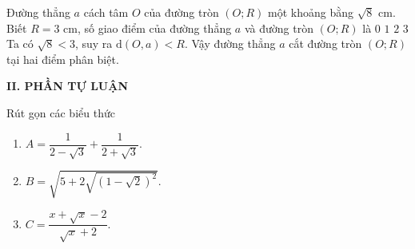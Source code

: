 \begin{ex}%
	 Đường thẳng $a$ cách tâm $O$ của đường tròn $(O;R)$ một khoảng bằng $\sqrt{8}$ cm. Biết $R=3$ cm, số giao điểm của đường thẳng $a$ và đường tròn $(O;R)$ là
	\choice
	{$0$}
	{$1$}
	{\True $2$}
	{$3$}
	\loigiai
	{ Ta có $\sqrt{8} < 3$, suy ra $\mathrm{d}(O,a)<R$. Vậy đường thẳng $a$ cắt đường tròn $(O;R)$ tại hai điểm phân biệt.
	}
\end{ex}
\noindent\textbf{II. PHẦN TỰ LUẬN}
\setcounter{bt}{0}
\begin{bt}%
	Rút gọn các biểu thức
	\begin{multicols}{3}
		\begin{enumerate}
			\item $A=\dfrac{1}{2-\sqrt{3}}+\dfrac{1}{2+\sqrt{3}}$.
			\item $B=\sqrt{5+2\sqrt{(1-\sqrt{2})^2}}$.
			\item $C=\dfrac{x+\sqrt{x}-2}{\sqrt{x}+2}$.
		\end{enumerate}
	\end{multicols}
\end{bt}

